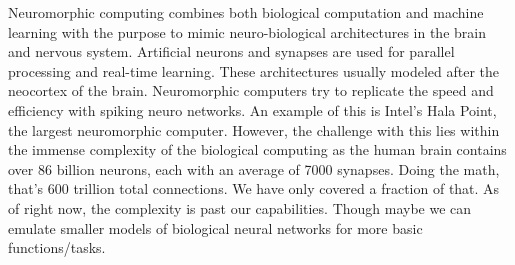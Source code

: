 \documentclass[letterpaper,11pt]{article}
\begin{document}
\begin{enumerate}[label=\alph*)]
\begin{tcolorbox}
Neuromorphic computing combines both biological computation and machine learning with the purpose to mimic neuro-biological architectures in the brain and nervous system. Artificial neurons and synapses are used for parallel processing and real-time learning. These architectures usually modeled after the neocortex of the brain. Neuromorphic computers try to replicate the speed and efficiency with spiking neuro networks. An example of this is Intel's Hala Point, the largest neuromorphic computer. However, the challenge with this lies within the immense complexity of the biological computing as the human brain contains over 86 billion neurons, each with an average of 7000 synapses. Doing the math, that's 600 trillion total connections. We have only covered a fraction of that. As of right now, the complexity is past our capabilities. Though maybe we can emulate smaller models of biological neural networks for more basic functions/tasks.
\end{tcolorbox}

\end{enumerate}
\end{document}
